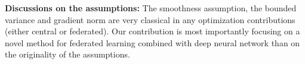 \documentclass{article}
\begin{document}
\textbf{Discussions on the assumptions:} The smoothness assumption, the bounded variance and gradient norm are very classical in any optimization contributions (either central or federated).
Our contribution is most importantly focusing on a novel method for federated learning combined with deep neural network than on the originality of the assumptions.










\end{document}

